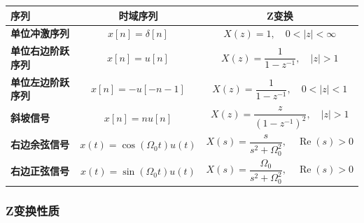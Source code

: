 \documentclass[UTF8,fontset=fandol,zihao=5]{ctexart}
\begin{document}
\begin{center}
\begin{table}[H]
  \centering
  \begin{tabularx}{\textwidth}{>{\bfseries}p{3cm} c c}
    \toprule
    序列 & 时域序列 & Z变换 \\
    \midrule
    单位冲激序列 & $x[n]=\delta[n]$
      & $X(z)=1,\quad 0<|z|<\infty$ \\[6pt]

    单位右边阶跃序列 & $x[n]=u[n]$
      & $X(z)=\dfrac{1}{1-z^{-1}},\quad |z|>1$ \\[6pt]

    单位左边阶跃序列 & $x[n]=-u[-n-1]$
      & $X(z)=\dfrac{1}{1-z^{-1}},\quad 0<|z|<1$ \\[6pt]

    斜坡信号 & $x[n]=nu[n]$
      & $X(z)=\dfrac{z}{(1-z^{-1})^2},\quad |z|>1$ \\[6pt]

    右边余弦信号 & $x(t)=\cos(\varOmega_0t)u(t)$
      & $X(s)=\dfrac{s}{s^2+\varOmega_0^2},
        \quad \operatorname{Re}(s)>0$ \\

    右边正弦信号 & $x(t)=\sin(\varOmega_0t)u(t)$
      & $X(s)=\dfrac{\varOmega_0}{s^2+\varOmega_0^2},
        \quad \operatorname{Re}(s)>0$ \\
    \bottomrule
  \end{tabularx}
\end{table}
\end{center}

\subsubsection{Z变换性质}
\end{document}
